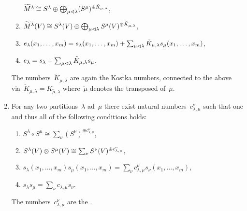 \documentclass[a4paper,10pt]{scrartcl}
\begin{document}
\begin{example}
\begin{enumerate}
\begin{enumerate}
          $\widetilde{M}^\lambda \cong S^\lambda \oplus \bigoplus_{\mu \vartriangleleft \lambda} (S^\mu)^{\oplus \tilde{K}_{\mu, \lambda}}$,
        \item
          $\widetilde{M}^\lambda(V) \cong S^\lambda(V) \oplus \bigoplus_{\mu \vartriangleleft \lambda} S^\mu(V)^{\oplus \tilde{K}_{\mu, \lambda}}$,
        \item
          $e_\lambda(x_1, \dotsc, x_m) = s_\lambda(x_1, \dotsc, x_m) + \sum_{\mu \vartriangleleft \lambda} \tilde{K}_{\mu, \lambda} s_\mu(x_1, \dotsc, x_m)$,
        \item
          $e_\lambda = s_\lambda + \sum_{\mu \vartriangleleft \lambda} \tilde{K}_{\mu, \lambda} s_\mu$.
      \end{enumerate}
      The numbers~$\tilde{K}_{\mu, \lambda}$ are again the Kostka numbers, connected to the above via~$\tilde{K}_{\mu, \lambda} = K_{\tilde{\mu}, \lambda}$ where~$\tilde{\mu}$ denotes the transposed of~$\mu$.
    \item
      For any two partitions~$\lambda$ ad~$\mu$ there exist natural numbers~$c^{\nu}_{\lambda, \mu}$ such that one and thus all of the following conditions holds:
      \begin{enumerate}
        \item
          $S^\lambda \circ S^\mu \cong \sum_\nu (S^\nu)^{\oplus c_{\lambda, \mu}^{\nu}}$,
        \item
          $S^\lambda(V) \otimes S^\mu(V) \cong \sum_\nu S^\nu(V)^{\oplus c_{\lambda, \mu}^{\nu}}$,
        \item
          $s_\lambda(x_1, \dotsc, x_m) s_\mu(x_1, \dotsc, x_m) = \sum_{\nu} c_{\lambda, \mu}^\nu s_\nu(x_1, \dotsc, x_m)$,
        \item
          $s_\lambda s_\mu = \sum_{\nu} c_{\lambda, \mu} s_\nu$.
      \end{enumerate}
      The numbers~$c_{\lambda, \mu}^{\nu}$ are the .
  \end{enumerate}
\end{example}
\end{document}
